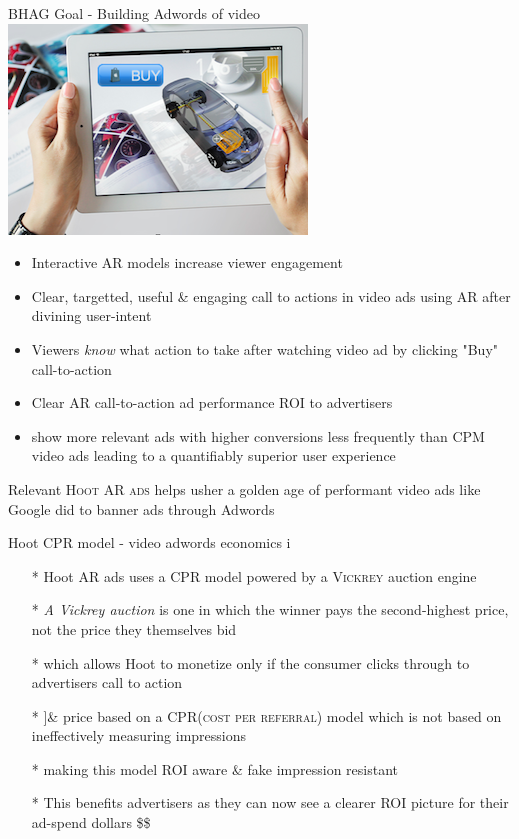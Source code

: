 \documentclass[10pt,handout]{beamer}
\begin{document}
\begin{frame}[fragile]{ BHAG Goal - Building Adwords of video \includegraphics[scale=.1]{static/arad/arad5} }
\begin{itemize}[<+-| alert@+>]
\item Interactive AR models increase viewer engagement
\item Clear, targetted, useful \& engaging call to actions in video ads using AR after divining user-intent
\item Viewers \emph{know} what action to take after watching video ad by clicking "Buy" call-to-action
\item Clear AR call-to-action ad performance \textsc{ROI} to advertisers 
\item show more relevant ads with higher conversions less frequently than CPM video ads leading to a quantifiably superior user experience 
\end{itemize}
\pause

\Large{
Relevant \textsc{Hoot AR ads} helps usher a golden age of performant video ads like Google did to banner ads through Adwords
}



\end{frame}

\begin{frame}[t]{Hoot CPR model - video adwords economics i}
\begin{itemize}[<+-| alert@+>]
\item[*] Hoot AR ads uses a CPR model powered by a \textsc{Vickrey} auction engine
\item[*]\emph{A Vickrey auction} is one in which the winner pays the second-highest price, not the price they themselves bid
\item[*]which allows Hoot to monetize only if the consumer clicks through to advertisers call to action
\item[*]]\& price based on a \textsc{CPR(cost per referral)} model which is not based on ineffectively measuring impressions
\item[*]making this model ROI aware \& fake impression resistant
\item[*]This benefits advertisers as they can now see a clearer ROI picture for their ad-spend dollars \$\$ 
\end{itemize}
\end{frame}
\end{document}
